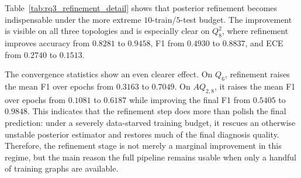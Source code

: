 \begin{table}[t]
\centering
\caption{Complete topology-wise results for the posterior refinement study.}
\label{tab:rq3_refinement_detail}
\vspace{1mm}
\end{table}

Table~\ref{tab:rq3_refinement_detail} shows that posterior refinement becomes indispensable under the more extreme $10$-train/$5$-test budget. The improvement is visible on all three topologies and is especially clear on $Q_8^2$, where refinement improves accuracy from $0.8281$ to $0.9458$, F1 from $0.4930$ to $0.8837$, and ECE from $0.2740$ to $0.1513$.

The convergence statistics show an even clearer effect. On $Q_6$, refinement raises the mean F1 over epochs from $0.3163$ to $0.7049$. On $AQ_{2,8}$, it raises the mean F1 over epochs from $0.1081$ to $0.6187$ while improving the final F1 from $0.5405$ to $0.9848$. This indicates that the refinement step does more than polish the final prediction: under a severely data-starved training budget, it rescues an otherwise unstable posterior estimator and restores much of the final diagnosis quality. Therefore, the refinement stage is not merely a marginal improvement in this regime, but the main reason the full pipeline remains usable when only a handful of training graphs are available.

